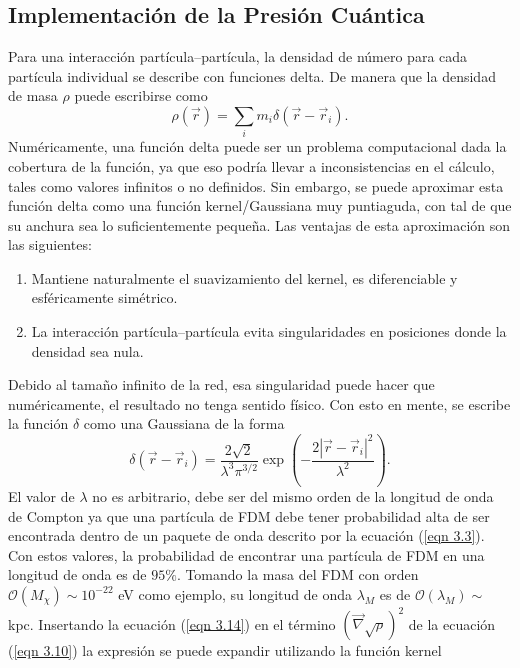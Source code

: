 \documentclass[a4paper,openright,10pt, oneside, final]{book}
\begin{document}
\subsection{Implementación de la Presión Cuántica}
Para una interacción partícula--partícula, la densidad de número para cada partícula individual se describe con funciones delta. De manera que la densidad de masa $\rho$ puede escribirse como
\begin{equation}
\rho(\vec{r})
=
\sum_{i}m_{i}\delta(\vec{r}-\vec{r}_{i}).\label{eqn 3.13}
\end{equation}
Numéricamente, una función delta puede ser un problema computacional dada la cobertura de la función, ya que eso podría llevar a inconsistencias en el cálculo, tales como valores infinitos o no definidos. Sin embargo, se puede aproximar esta función delta como una función kernel/Gaussiana muy puntiaguda, con tal de que su anchura sea lo suficientemente pequeña.
Las ventajas de esta aproximación son las siguientes:
\begin{enumerate}
\item Mantiene naturalmente el suavizamiento del kernel, es diferenciable y esféricamente simétrico. 
\item La interacción partícula--partícula evita singularidades en posiciones donde la densidad sea nula.
\end{enumerate}
Debido al tamaño infinito de la red, esa singularidad puede hacer que numéricamente, el resultado no tenga sentido físico.
Con esto en mente, se escribe la función $\delta$ como una Gaussiana de la forma
\begin{equation}
\delta (\vec{r}-\vec{r}_{i}) = 
\frac{2\sqrt{2}}{\lambda ^{3} \pi ^{3/2}} \exp \left(-\frac{2|\vec{r}-\vec{r}_{i}|^{2}}{\lambda ^{2}}\right).\label{eqn 3.14}
\end{equation}
El valor de $\lambda$ no es arbitrario, debe ser del mismo orden de la longitud de onda de Compton ya que una partícula de FDM debe tener probabilidad alta de ser encontrada dentro de un paquete de onda descrito por la ecuación (\ref{eqn 3.3}). Con estos valores, la probabilidad de encontrar una partícula de FDM en una longitud de onda es de $95 \%$. Tomando la masa del FDM con orden $\mathcal{O}(M_{\chi})\sim 10^{-22}$ eV como ejemplo, su longitud de onda $\lambda_{M}$ es de $\mathcal{O}(\lambda_{M})\sim$ kpc. Insertando la ecuación (\ref{eqn 3.14}) en el término $(\vec{\nabla}\sqrt{\rho})^{2}$ de la ecuación (\ref{eqn 3.10}) la expresión se puede expandir utilizando la función kernel
\end{document}
